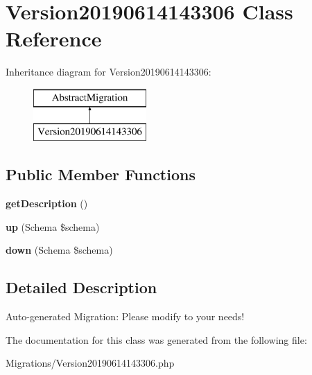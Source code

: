 \hypertarget{class_doctrine_migrations_1_1_version20190614143306}{}\section{Version20190614143306 Class Reference}
\label{class_doctrine_migrations_1_1_version20190614143306}
Inheritance diagram for Version20190614143306\+:\begin{figure}[H]
\begin{center}
\leavevmode
\includegraphics[height=2.000000cm]{class_doctrine_migrations_1_1_version20190614143306}
\end{center}
\end{figure}
\subsection*{Public Member Functions}
\begin{DoxyCompactItemize}
\item 
\mbox{\label{class_doctrine_migrations_1_1_version20190614143306_a2e7bb35c71bf1824456ceb944cb7a845}} 
{\bfseries get\+Description} ()
\item 
\mbox{\label{class_doctrine_migrations_1_1_version20190614143306_a23eb1c1428e8ea2ab2cf798fc06ec421}} 
{\bfseries up} (Schema \$schema)
\item 
\mbox{\label{class_doctrine_migrations_1_1_version20190614143306_aa8eb70255a46429d4d6165c778c9e5b9}} 
{\bfseries down} (Schema \$schema)
\end{DoxyCompactItemize}


\subsection{Detailed Description}
Auto-\/generated Migration\+: Please modify to your needs! 

The documentation for this class was generated from the following file\+:\begin{DoxyCompactItemize}
\item 
Migrations/Version20190614143306.\+php\end{DoxyCompactItemize}
